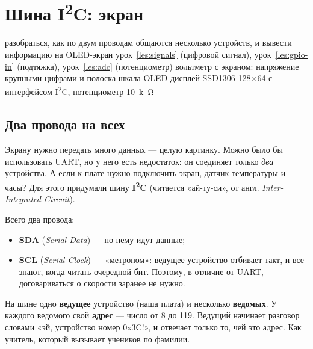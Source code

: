 \section{Шина I\texorpdfstring{\textsuperscript{2}}{2}C: экран}
\label{les:i2c}
\lessonintro
  {разобраться, как по двум проводам общаются несколько устройств, и вывести информацию на OLED-экран}
  {урок~\ref{les:signals} (цифровой сигнал), урок~\ref{les:gpio-in} (подтяжка), урок~\ref{les:adc} (потенциометр)}
  {вольтметр с экраном: напряжение крупными цифрами и полоска-шкала}
  {OLED-дисплей SSD1306 128×64 с интерфейсом I\textsuperscript{2}C, потенциометр \SI{10}{k\ohm}}

\subsection{Два провода на всех}

Экрану нужно передать много данных --- целую картинку. Можно было бы использовать UART, но у него
есть недостаток: он соединяет только \emph{два} устройства. А если к плате нужно подключить экран,
датчик температуры и часы? Для этого придумали шину \textbf{I\textsuperscript{2}C} (читается «ай-ту-си»,
от англ. \emph{Inter-Integrated Circuit}).

Всего два провода:
\begin{itemize}
  \item \textbf{SDA} (\emph{Serial Data}) --- по нему идут данные;
  \item \textbf{SCL} (\emph{Serial Clock}) --- «метроном»: ведущее устройство отбивает такт, и все знают,
        когда читать очередной бит. Поэтому, в отличие от UART, договариваться о скорости заранее не нужно.
\end{itemize}

На шине одно \textbf{ведущее} устройство (наша плата) и несколько \textbf{ведомых}. У каждого ведомого
свой \textbf{адрес} --- число от 8 до 119. Ведущий начинает разговор словами «эй, устройство номер 0x3C!»,
и отвечает только то, чей это адрес. Как учитель, который вызывает учеников по фамилии.

